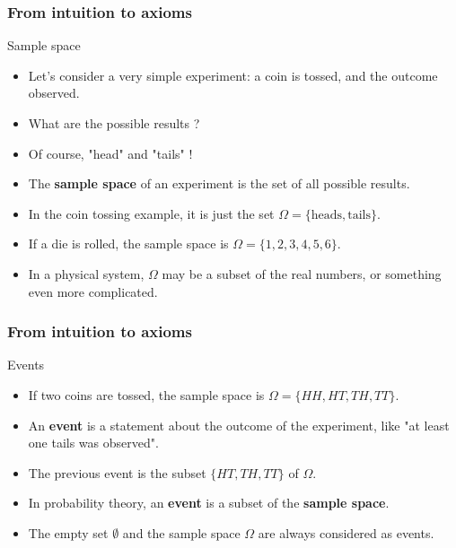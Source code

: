 \begin{frame}
    \frametitle{From intuition to axioms }
\begin{block}{Sample space}
    \begin{itemize}
        \item<+-> Let's consider a very simple experiment: a coin is tossed, and the outcome observed.
        \item<+-> What are the possible results ?
        \item<+-> Of course, "head" and "tails" !
        \item<+-> The \textbf{sample space} of an experiment is the set of all possible results.
        \item<+-> In the coin tossing example, it is just the set $\Omega = \{ \text{heads}, \text{tails}\}.$
        \item<+-> If a die is rolled, the sample space is $\Omega = \{ 1,2,3,4,5, 6\}.$
        \item<+-> In a physical system, $\Omega$ may be a subset of the real numbers,
        or something even more complicated.
    \end{itemize}
\end{block}    
\end{frame}
\begin{frame}
    \frametitle{From intuition to axioms}
\begin{block}{Events}
    \begin{itemize}
        \item<+-> If two coins are tossed, the sample space is 
        $\Omega = \{ HH, HT, TH, TT \}.$
        \item<+-> An \textbf{event} is a statement about the outcome of the experiment, 
        like "at least one tails was observed".
        \item<+-> The previous event is the subset $\{HT,TH,TT\}$ of $\Omega.$
        \item<+-> In probability theory, an \textbf{event} is a subset of the \textbf{sample space}.
        \item<+-> The empty set $\emptyset$ and the sample space $\Omega$ are 
        always considered as events.
    \end{itemize}
\end{block}
\end{frame}
